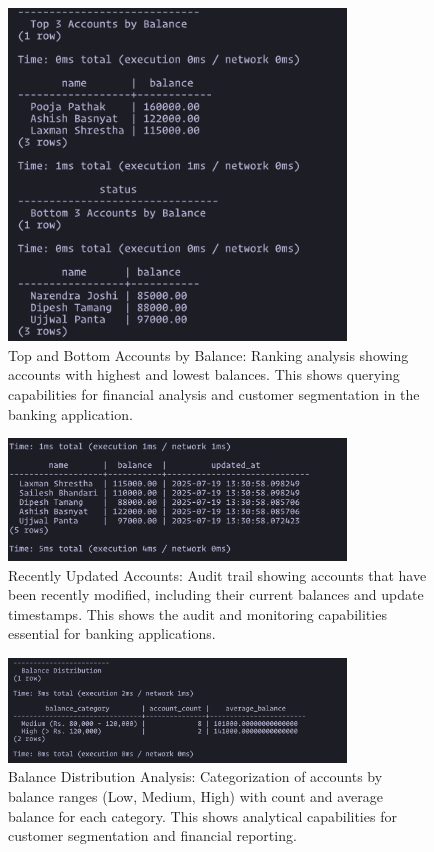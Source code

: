 \begin{figure}[H]
  \centering
  \includegraphics[width=0.8\textwidth]{task-5/screenshots/top-bottom-accounts.png}
  \caption{Top and Bottom Accounts by Balance: Ranking analysis showing accounts with highest and lowest balances. This shows querying capabilities for financial analysis and customer segmentation in the banking application.}
  \label{fig:task5-top-bottom-accounts}
\end{figure}

\begin{figure}[H]
  \centering
  \includegraphics[width=0.8\textwidth]{task-5/screenshots/recently-updated-accounts.png}
  \caption{Recently Updated Accounts: Audit trail showing accounts that have been recently modified, including their current balances and update timestamps. This shows the audit and monitoring capabilities essential for banking applications.}
  \label{fig:task5-recently-updated-accounts}
\end{figure}

\begin{figure}[H]
  \centering
  \includegraphics[width=0.8\textwidth]{task-5/screenshots/balance-distribution.png}
  \caption{Balance Distribution Analysis: Categorization of accounts by balance ranges (Low, Medium, High) with count and average balance for each category. This shows analytical capabilities for customer segmentation and financial reporting.}
  \label{fig:task5-balance-distribution}
\end{figure}